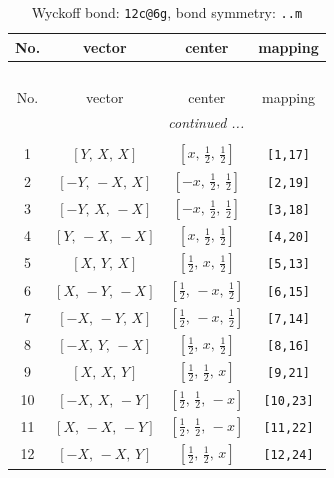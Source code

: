 \documentclass[fleqn,8pt]{jsarticle}
\begin{document}
\begin{longtable}{cccc}
\caption{Wyckoff bond: {\tt 12c@6g}, bond symmetry: {\tt ..m}}
 \\
 \hline \hline
No. & vector & center & mapping \\ \hline \endfirsthead

\multicolumn{3}{l}{\tablename\ \thetable{}} \\
 \hline \hline
No. & vector & center & mapping \\ \hline \endhead

 \hline \hline
\multicolumn{3}{r}{\footnotesize\it continued ...} \\ \endfoot

 \hline \hline
\multicolumn{3}{r}{} \\ \endlastfoot

1 & $\left[ Y,\, X,\, X \right]$ & $\left[ x,\, \frac{1}{2},\, \frac{1}{2} \right]$ & {\tt [1,17]} \\ \hline
2 & $\left[ - Y,\, - X,\, X \right]$ & $\left[ - x,\, \frac{1}{2},\, \frac{1}{2} \right]$ & {\tt [2,19]} \\ \hline
3 & $\left[ - Y,\, X,\, - X \right]$ & $\left[ - x,\, \frac{1}{2},\, \frac{1}{2} \right]$ & {\tt [3,18]} \\ \hline
4 & $\left[ Y,\, - X,\, - X \right]$ & $\left[ x,\, \frac{1}{2},\, \frac{1}{2} \right]$ & {\tt [4,20]} \\ \hline
5 & $\left[ X,\, Y,\, X \right]$ & $\left[ \frac{1}{2},\, x,\, \frac{1}{2} \right]$ & {\tt [5,13]} \\ \hline
6 & $\left[ X,\, - Y,\, - X \right]$ & $\left[ \frac{1}{2},\, - x,\, \frac{1}{2} \right]$ & {\tt [6,15]} \\ \hline
7 & $\left[ - X,\, - Y,\, X \right]$ & $\left[ \frac{1}{2},\, - x,\, \frac{1}{2} \right]$ & {\tt [7,14]} \\ \hline
8 & $\left[ - X,\, Y,\, - X \right]$ & $\left[ \frac{1}{2},\, x,\, \frac{1}{2} \right]$ & {\tt [8,16]} \\ \hline
9 & $\left[ X,\, X,\, Y \right]$ & $\left[ \frac{1}{2},\, \frac{1}{2},\, x \right]$ & {\tt [9,21]} \\ \hline
10 & $\left[ - X,\, X,\, - Y \right]$ & $\left[ \frac{1}{2},\, \frac{1}{2},\, - x \right]$ & {\tt [10,23]} \\ \hline
11 & $\left[ X,\, - X,\, - Y \right]$ & $\left[ \frac{1}{2},\, \frac{1}{2},\, - x \right]$ & {\tt [11,22]} \\ \hline
12 & $\left[ - X,\, - X,\, Y \right]$ & $\left[ \frac{1}{2},\, \frac{1}{2},\, x \right]$ & {\tt [12,24]} \\
\end{longtable}
\end{document}
